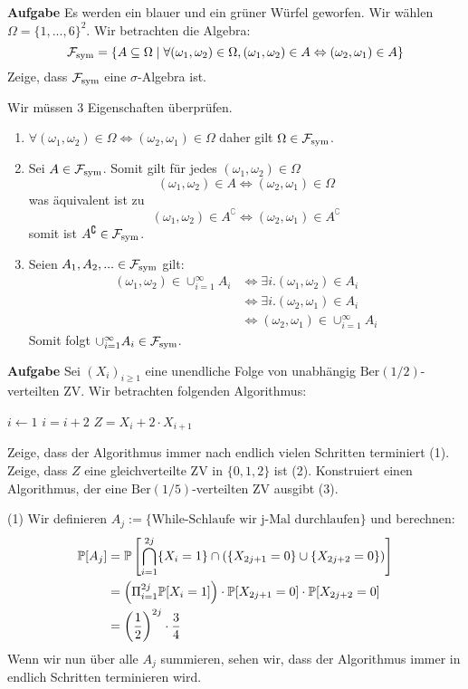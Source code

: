 \textbf{Aufgabe}
Es werden ein blauer und ein grüner Würfel geworfen. Wir wählen $\Omega = \{1,...,6\}^2$. Wir betrachten die Algebra:
$$\mathcal{F}_{\text{sym}} = \{ A \subseteq \Omega \; | \; \forall (\omega_1, \omega_2) \in \Omega, (\omega_1, \omega_2) \in A \Leftrightarrow (\omega_2, \omega_1) \in A  \}$$
Zeige, dass $\mathcal{F}_{\text{sym}}$ eine $\sigma$-Algebra ist. \medskip

Wir müssen 3 Eigenschaften überprüfen. 
\begin{enumerate}
	\item $\forall (\omega_1, \omega_2) \in \Omega \Leftrightarrow (\omega_2, \omega_1) \in \Omega$ daher gilt $\Omega \in \mathcal{F}_{\text{sym}}$.
	\item Sei $A \in \mathcal{F}_{\text{sym}}$. Somit gilt für jedes $(\omega_1, \omega_2) \in \Omega$
		$$(\omega_1, \omega_2) \in A \Leftrightarrow (\omega_2, \omega_1) \in \Omega$$
		was äquivalent ist zu
		$$(\omega_1, \omega_2) \in A^\complement \Leftrightarrow (\omega_2, \omega_1) \in A^\complement$$
		somit ist $A^\complement \in \mathcal{F}_{\text{sym}}$.
	\item Seien $A_1, A_2, ... \in \mathcal{F}_{\text{sym}}$ gilt:
		\begin{align*}
			(\omega_1, \omega_2) \in \cup_{i=1}^\infty A_i &\Leftrightarrow \exists i. (\omega_1, \omega_2) \in A_i \\
			&\Leftrightarrow \exists i. (\omega_2, \omega_1) \in A_i \\
			&\Leftrightarrow (\omega_2, \omega_1) \in \cup_{i=1}^\infty A_i
		\end{align*}
		Somit folgt $\cup_{i=1}^\infty A_i \in \mathcal{F}_{\text{sym}}$.
\end{enumerate}

\hrulefill

\textbf{Aufgabe}
Sei $(X_i)_{i \geq 1}$ eine unendliche Folge von unabhängig $\text{Ber}(1/2)$-verteilten ZV. Wir betrachten folgenden Algorithmus:

\begin{algorithmic}
	\State $i \gets 1$
		\State $i = i + 2$
	\EndWhile
	\State \Return $Z = X_i + 2 \cdot X_{i+1}$
\end{algorithmic}

Zeige, dass der Algorithmus immer nach endlich vielen Schritten terminiert (1). Zeige, dass $Z$ eine gleichverteilte ZV in $\{0,1,2\}$ ist (2). Konstruiert einen Algorithmus, der eine $\text{Ber}(1/5)$-verteilten ZV ausgibt (3). \medskip

(1) Wir definieren $A_j := \{ \text{While-Schlaufe wir j-Mal durchlaufen} \}$ und berechnen:
\begin{align*}
	\mathbb{P}[A_j] &= \mathbb{P} \left[ \bigcap_{i=1}^{2j} \{X_i = 1\} \cap (\{X_{2j+1} = 0\} \cup \{X_{2j+2} = 0\}) \right] \\
	&= \left( \Pi_{i=1}^{2j} \mathbb{P}[X_i = 1] \right) \cdot \mathbb{P}[X_{2j+1} = 0] \cdot \mathbb{P}[X_{2j+2} = 0] \\
	&= \left(\frac{1}{2}\right)^{2j} \cdot \frac{3}{4}
\end{align*}
Wenn wir nun über alle $A_j$ summieren, sehen wir, dass der Algorithmus immer in endlich Schritten terminieren wird. \medskip


